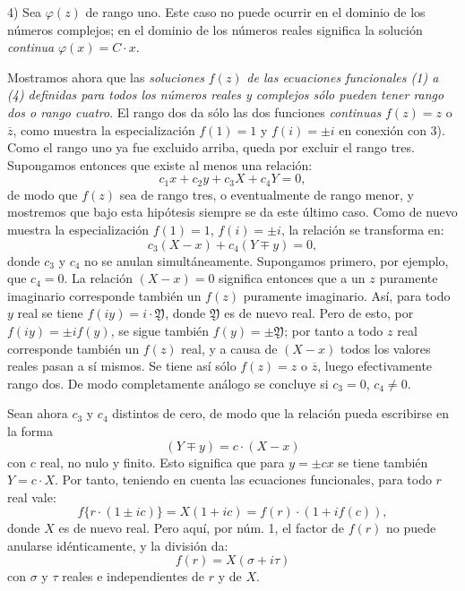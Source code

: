 \documentclass[11pt]{article}
\begin{document}
4) Sea $\varphi(z)$ de rango uno. Este caso no puede ocurrir en el dominio de los números complejos; en el dominio de los números reales significa la solución \emph{continua} $\varphi(x)=C\cdot x$.

Mostramos ahora que las \emph{soluciones} $f(z)$ \emph{de las ecuaciones funcionales (1) a (4) definidas para todos los números reales y complejos sólo pueden tener rango dos o rango cuatro}. El rango dos da sólo las dos funciones \emph{continuas} $f(z)=z$ o $\overline z$, como muestra la especialización $f(1)=1$ y $f(i)=\pm i$ en conexión con 3). Como el rango uno ya fue excluido arriba, queda por excluir el rango tres. Supongamos entonces que existe al menos una relación:
\[
c_1x+c_2y+c_3X+c_4Y=0,
\]
de modo que $f(z)$ sea de rango tres, o eventualmente de rango menor, y mostremos que bajo esta hipótesis siempre se da este último caso. Como de nuevo muestra la especialización $f(1)=1$, $f(i)=\pm i$, la relación se transforma en:
\[
c_3(X-x)+c_4(Y\mp y)=0,
\]
donde $c_3$ y $c_4$ no se anulan simultáneamente. Supongamos primero, por ejemplo, que $c_4=0$. La relación $(X-x)=0$ significa entonces que a un $z$ puramente imaginario corresponde también un $f(z)$ puramente imaginario. Así, para todo $y$ real se tiene $f(iy)=i\cdot\mathfrak Y$, donde $\mathfrak Y$ es de nuevo real. Pero de esto, por $f(iy)=\pm i f(y)$, se sigue también $f(y)=\pm\mathfrak Y$; por tanto a todo $z$ real corresponde también un $f(z)$ real, y a causa de $(X-x)$ todos los valores reales pasan a sí mismos. Se tiene así sólo $f(z)=z$ o $\overline z$, luego efectivamente rango dos. De modo completamente análogo se concluye si $c_3=0$, $c_4\ne0$.

Sean ahora $c_3$ y $c_4$ distintos de cero, de modo que la relación pueda escribirse en la forma
\[
(Y\mp y)=c\cdot(X-x)
\]
con $c$ real, no nulo y finito. Esto significa que para $y=\pm cx$ se tiene también $Y=c\cdot X$. Por tanto, teniendo en cuenta las ecuaciones funcionales, para todo $r$ real vale:
\[
f\{r\cdot(1\pm ic)\}=X(1+ic)=f(r)\cdot(1+i f(c)),
\]
donde $X$ es de nuevo real. Pero aquí, por núm. 1, el factor de $f(r)$ no puede anularse idénticamente, y la división da:
\[
f(r)=X(\sigma+i\tau)
\]
con $\sigma$ y $\tau$ reales e independientes de $r$ y de $X$.
\end{document}
